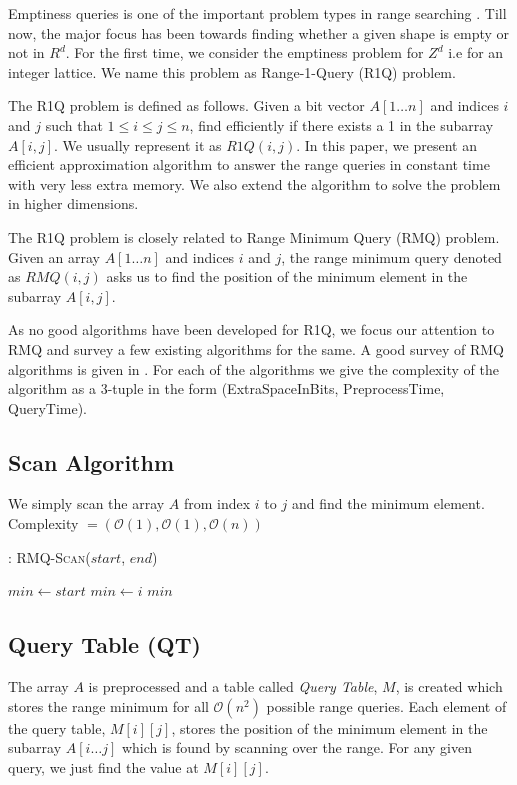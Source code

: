 \documentclass{article}
\begin{document}
Emptiness queries is one of the important problem types in range searching \cite{erickson}. Till now, the major focus has been towards finding whether a given shape is empty or not in $R^d$. For the first time, we consider the emptiness problem for $Z^d$ i.e for an integer lattice. We name this problem as Range-1-Query (R1Q) problem.

The R1Q problem is defined as follows. Given a bit vector $A[1 \ldots n]$ and indices $i$ and $j$ such that $1 \le i \le j \le n$, find efficiently if there exists a 1 in the subarray $A[i, j]$. We usually represent it as $R1Q(i, j)$. In this paper, we present an efficient approximation algorithm to answer the range queries in constant time with very less extra memory. We also extend the algorithm to solve the problem in higher dimensions.

The R1Q problem is closely related to Range Minimum Query (RMQ) problem. Given an array $A[1 \ldots n]$ and indices $i$ and $j$, the range minimum query denoted as $RMQ(i, j)$ asks us to find the position of the minimum element in the subarray $A[i, j]$.

As no good algorithms have been developed for R1Q, we focus our attention to RMQ and survey a few existing algorithms for the same. A good survey of RMQ algorithms is given in \cite{website:danielp}. For each of the algorithms we give the complexity of the algorithm as a 3-tuple in the form (ExtraSpaceInBits, PreprocessTime, QueryTime).

\subsection{Scan Algorithm}
We simply scan the array $A$ from index $i$ to $j$ and find the minimum element.\\
Complexity $= (\mathcal{O}(1), \mathcal{O}(1), \mathcal{O}(n))$   

\begin{algorithm}
\begin{algorithmic}[1]
\caption{: \textsc{RMQ-Scan}($start$, $end$)}
\medskip
\STATE $min \gets start$
\medskip
{}
		\STATE $min \gets i$
	\ENDIF
\ENDFOR
\medskip
\RETURN $min$
\medskip
\end{algorithmic}
\end{algorithm}

\subsection{Query Table (QT)}
The array $A$ is preprocessed and a table called \textit{Query Table}, $M$, is created which stores the range minimum for all $\mathcal{O}(n^2)$ possible range queries. Each element of the query table, $M[i][j]$, stores the position of the minimum element in the subarray $A[i \ldots j]$ which is found by scanning over the range. For any given query, we just find the value at $M[i][j]$.
\end{document}
